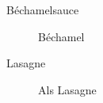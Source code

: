 \begin{description}
  \item [Béchamelsauce] Béchamel %
  \item [Lasagne] Als Lasagne %
\end{description}
